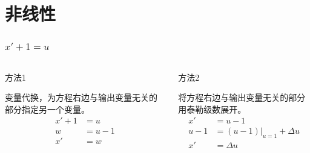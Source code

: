 \documentclass{beamer}
\begin{document}
\section{非线性}
\label{sec-2}
\begin{frame}
\frametitle{$x'+1 =u$}
\label{sec-2-1}
\begin{columns}
\begin{column}{0.5\textwidth}
\begin{block}{方法1}
\label{sec-2-1-1}

变量代换，为方程右边与输出变量无关的部分指定另一个变量。
\begin{align*}
x'+1 &= u \\
w &= u-1 \\
x' &= w \\
\end{align*}
\end{block}
\end{column}
\begin{column}{0.5\textwidth}
\begin{block}{方法2}
\label{sec-2-1-2}

将方程右边与输出变量无关的部分用泰勒级数展开。
\begin{align*}
x' &=u-1 \\
u-1 &= (u-1)|_{u=1}+\Delta u \\
x' &= \Delta u \\
\end{align*}
\end{block}
\end{column}
\end{columns}
\end{frame}
\end{document}
